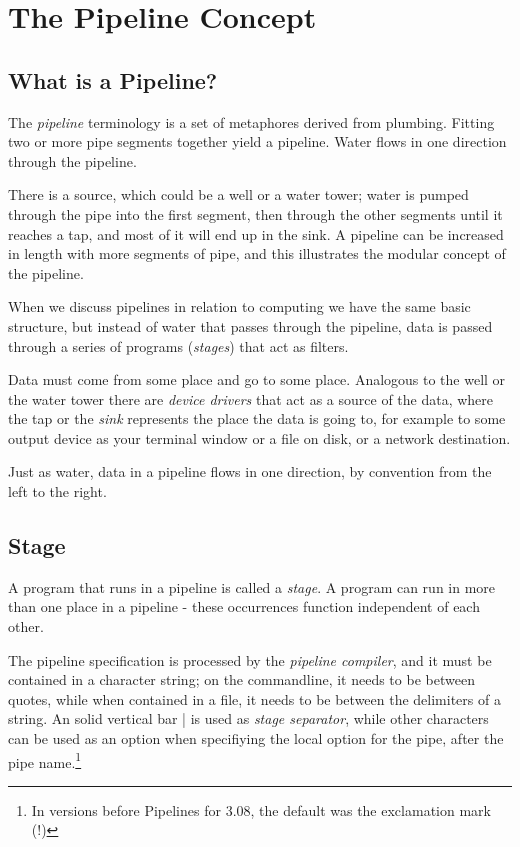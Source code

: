 \chapter{The Pipeline Concept}
\section{What is a Pipeline?}
The \emph{pipeline} terminology is a set of metaphores derived from
plumbing. Fitting two or more pipe segments together yield a
pipeline. Water flows in one direction through the pipeline.

There is a source, which could be a well or a water tower; water is
pumped through the pipe into the first segment, then through the other
segments until it reaches a tap, and most of it will end up in the
sink. A pipeline can be increased in length with more segments of
pipe, and this illustrates the modular concept of the pipeline.

When we discuss pipelines in relation to computing we have the same
basic structure, but instead of water that passes through the
pipeline, data is passed through a series of programs (\emph{stages})
that act as filters.

Data must come from some place and go to some place. Analogous to the
well or the water tower there are \emph{device drivers} that act as a
source of the data, where the tap or the \emph{sink} represents the place the
data is going to, for example to some output device as your terminal
window or a file on disk, or a network destination.

Just as water, data in a pipeline flows in one direction, by
convention from the left to the right.
\section{Stage}
A program that runs in a pipeline is called a \emph{stage}. A program
can run in more than one place in a pipeline - these occurrences
function independent of each other. 

The pipeline specification is processed by the \emph{pipeline
  compiler}, and it must be contained in a character string; on the
commandline, it needs to be between quotes, while when contained in a
file, it needs to be between the delimiters of a \nr{} string. An
solid vertical bar | is used as \emph{stage separator}, while other characters
can be used as an option when specifiying the
local option for the pipe, after the pipe name.\footnote{In versions
  before Pipelines for \nr{} 3.08, the default was the exclamation mark (!)}

